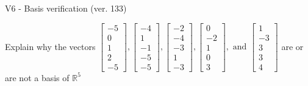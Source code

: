 \begin{exercise}
  \begin{exerciseTitle}V6 - Basis verification (ver. 133)\end{exerciseTitle}
  \begin{exerciseStatement}
    Explain why the vectors \(\left[\begin{array}{r}
-5 \\
0 \\
1 \\
2 \\
-5
\end{array}\right] , \left[\begin{array}{r}
-4 \\
1 \\
-1 \\
-5 \\
-5
\end{array}\right] , \left[\begin{array}{r}
-2 \\
-4 \\
-3 \\
1 \\
-3
\end{array}\right] , \left[\begin{array}{r}
0 \\
-2 \\
1 \\
0 \\
3
\end{array}\right] , \text{ and } \left[\begin{array}{r}
1 \\
-3 \\
3 \\
3 \\
4
\end{array}\right]\) are or are not a basis of \(\mathbb{R}^5\)	



\end{exerciseStatement}
\end{exercise}
